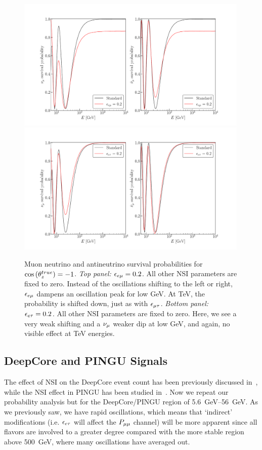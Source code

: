 \begin{figure}
    \begin{center}
        \includegraphics[width=0.99\textwidth]{figures/eem_probs.pdf}
        \includegraphics[width=0.99\textwidth]{figures/eet_probs.pdf}
        \caption{Muon neutrino and antineutrino survival probabilities for
        $\cos{(\theta_z^{true})} = -1$. \emph{Top panel:} $\epsilon_{e\mu} = 0.2$. All other NSI parameters are fixed to zero. Instead of the oscillations shifting to the left or right, $\epsilon_{e\mu}$ dampens an oscillation peak for low \si{\GeV}. At \si{\TeV}, the probability is shifted down, just as with $\epsilon_{\mu\tau}$.
        \emph{Bottom panel:} $\epsilon_{e\tau} = 0.2$. All other NSI parameters are fixed to zero. Here, we see a very weak shifting and a $\nu_\mu$ weaker dip at low \si{\GeV}, and again, no visible effect at \si{TeV} energies. }
        \label{fig:eem_eet_probs}
    \end{center}
\end{figure}


\subsection{DeepCore and PINGU Signals}
The effect of NSI on the DeepCore event count has been previously discussed in~\cite{smirnovNSI}, while the NSI effect 
in PINGU has been studied in~\cite{choubey2014, ohlsson2013}.
Now we repeat our probability analysis but for the DeepCore/PINGU region of \SIrange{5.6}{56}{\GeV}. As we previously saw,
we have rapid oscillations, which means that `indirect' modifications (i.e. $\epsilon_{e\tau}$ will affect the $P_{\mu\mu}$ channel)
will be more apparent since all flavors are involved to a greater degree compared with the more stable region above \SI{500}{\GeV}, where 
many oscillations have averaged out.

